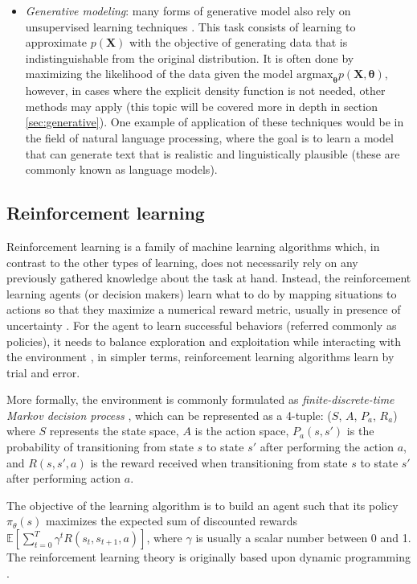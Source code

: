 \begin{itemize}
	\item \textit{Generative modeling}: many forms of generative model also rely on unsupervised learning techniques \autocite{bishop2006}. This task consists of learning to approximate $p(\mathbf{X})$ with the objective of generating data that is indistinguishable from the original distribution. It is often done by maximizing the likelihood of the data given the model $\mathrm{argmax}_\mathbf{\theta} p(\mathbf{\mathbf{X},\mathbf{\theta}})$, however, in cases where the explicit density function is not needed, other methods may apply (this topic will be covered more in depth in section \ref{sec:generative}).  One example of application of these techniques would be in the field of natural language processing, where the goal is to learn a model that can generate text \autocite{uday2019} that is realistic and linguistically plausible (these are commonly known as language models).
\end{itemize}


\subsection{Reinforcement learning}
Reinforcement learning is a family of machine learning algorithms which, in contrast to the other types of learning, does not necessarily rely on any previously gathered knowledge about the task at hand. Instead, the reinforcement learning agents (or decision makers) learn what to do by mapping situations to actions \autocite{sutton2018} so that they maximize a numerical reward metric, usually in presence of uncertainty \autocite{haykin1998}. For the agent to learn successful behaviors (referred commonly as policies), it needs to balance exploration and exploitation while interacting with the environment \autocite{sutton2018}, in simpler terms, reinforcement learning algorithms learn by trial and error.

More formally, the environment is commonly formulated as \textit{finite-discrete-time Markov decision process} \autocite{haykin1998}, which can be represented as a 4-tuple: ($S$, $A$, $P_a$, $R_a$) where $S$ represents the state space, $A$ is the action space, $P_a(s, s')$ is the probability of transitioning from state $s$ to state $s'$ after performing the action $a$, and $R(s, s', a)$ is the reward received when transitioning from state $s$ to state $s'$ after performing action $a$. 

The objective of the learning algorithm is to build an agent such that its policy $\pi_\theta(s)$ maximizes the expected sum of discounted rewards $\mathbb{E} \left[ \sum_{t=0}^{T} \gamma^t R(s_t, s_{t+1}, a) \right]$, where $\gamma$ is usually a scalar number between 0 and 1. The reinforcement learning theory is originally based upon dynamic programming \autocite{szepesvari2010}.

